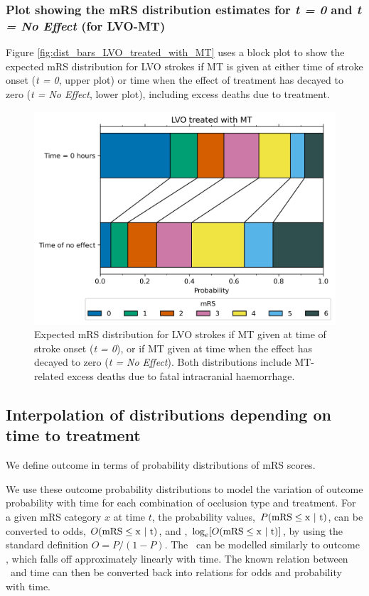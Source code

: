 {{\subsubsection{Plot showing the mRS distribution estimates for \textit{t = 0} and \textit{t = No Effect} (for LVO-MT)}

Figure \ref{fig:dist_bars_LVO_treated_with_MT} uses a block plot to show the expected mRS distribution for LVO strokes if MT is given at either time of stroke onset (\textit{t = 0}, upper plot) or time when the effect of treatment has decayed to zero (\textit{t = No Effect}, lower plot), including excess deaths due to treatment.

\begin{figure}[h]
    \centering
    \includegraphics[width=0.75\linewidth]{images/dist_bars_LVO_treated_with_MT}
    \caption{Expected mRS distribution for LVO strokes if MT given at time of stroke onset (\textit{t = 0}), or if MT given at time when the effect has decayed to zero (\textit{t = No Effect}). Both distributions include MT-related excess deaths due to fatal intracranial haemorrhage.}
    \label{fig:dist_bars_LVO_treated_with_IVT}
\end{figure}

\subsection{Interpolation of distributions depending on time to treatment}


We define outcome in terms of probability distributions of mRS scores. 

We use these outcome probability distributions to model the variation of outcome probability with time for each combination of occlusion type and treatment.
% 
For a given mRS category $x$ at time $t$, the probability values, $P(\mRS\leq x\ |\ t)$, can be converted to odds, $O(\rm{mRS}\leq x\ |\ t)$, and \logodds, $\log_e[O(\rm{mRS}\leq x\ |\ t)]$, by using the standard definition $O=P/(1-P)$.
The \logodds\ can be modelled similarly to outcome \logoddsratio, which falls off approximately linearly with time\cite{emberson_effect_2014, fransen_time_2016}. 
% 
The known relation between \logodds\ and time can then be converted back into relations for odds and probability with time.

}}
